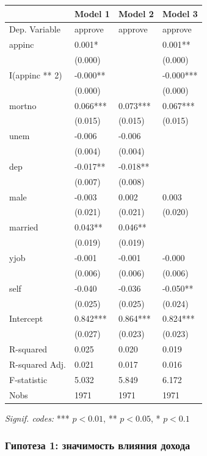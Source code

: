 \documentclass[
  russian,
]{article}
\newcounter{none} %
\begin{document}
{\def\LTcaptype{none} %
\begin{longtable}[]{@{}llll@{}}
\toprule\noalign{}
& Model 1 & Model 2 & Model 3 \\
\midrule\noalign{}
\endhead
\bottomrule\noalign{}
\endlastfoot
Dep. Variable & approve & approve & approve \\
appinc & 0.001* & & 0.001** \\
& (0.000) & & (0.000) \\
I(appinc ** 2) & -0.000** & & -0.000*** \\
& (0.000) & & (0.000) \\
mortno & 0.066*** & 0.073*** & 0.067*** \\
& (0.015) & (0.015) & (0.015) \\
unem & -0.006 & -0.006 & \\
& (0.004) & (0.004) & \\
dep & -0.017** & -0.018** & \\
& (0.007) & (0.008) & \\
male & -0.003 & 0.002 & 0.003 \\
& (0.021) & (0.021) & (0.020) \\
married & 0.043** & 0.046** & \\
& (0.019) & (0.019) & \\
yjob & -0.001 & -0.001 & -0.000 \\
& (0.006) & (0.006) & (0.006) \\
self & -0.040 & -0.036 & -0.050** \\
& (0.025) & (0.025) & (0.024) \\
Intercept & 0.842*** & 0.864*** & 0.824*** \\
& (0.027) & (0.023) & (0.023) \\
R-squared & 0.025 & 0.020 & 0.019 \\
R-squared Adj. & 0.021 & 0.017 & 0.016 \\
F-statistic & 5.032 & 5.849 & 6.172 \\
Nobs & 1971 & 1971 & 1971 \\
\end{longtable}
}

\emph{Signif. codes:} *** \(p<0.01\), ** \(p<0.05\), * \(p<0.1\)

\subsubsection{Гипотеза 1: значимость влияния
дохода}\label{ux433ux438ux43fux43eux442ux435ux437ux430-1-ux437ux43dux430ux447ux438ux43cux43eux441ux442ux44c-ux432ux43bux438ux44fux43dux438ux44f-ux434ux43eux445ux43eux434ux430}
\end{document}
